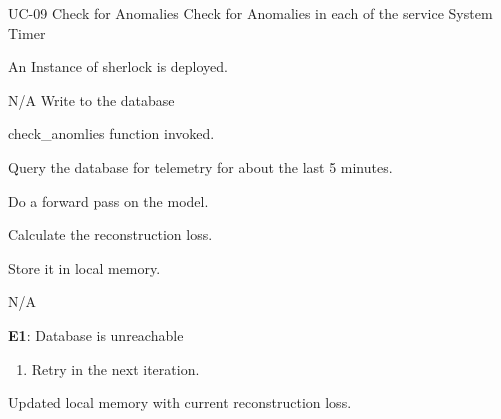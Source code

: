 \vspace{-2em}
\UseCaseDescription
{UC-09}
{Check for Anomalies}
{Check for Anomalies in each of the service}
{System Timer}
{\begin{CompactItemizes}
    \item An Instance of \ac{sherlock} is deployed.
\end{CompactItemizes}}
{N/A}
{Write to the database}
{\begin{CompactEnumerate}
    \item check\_anomlies function invoked.
    \item Query the database for telemetry for about the last 5 minutes.
    \item Do a forward pass on the model.
    \item Calculate the reconstruction loss.
    \item Store it in local memory.
\end{CompactEnumerate}}
{{N/A}
{\textbf{E1}: Database is unreachable
\vspace{-4mm}\begin{enumerate}
    \item Retry in the next iteration.
\vspace{-7mm}\end{enumerate}}
{\begin{CompactItemizes}
    \item Updated local memory with current reconstruction loss.
\end{CompactItemizes}}}

